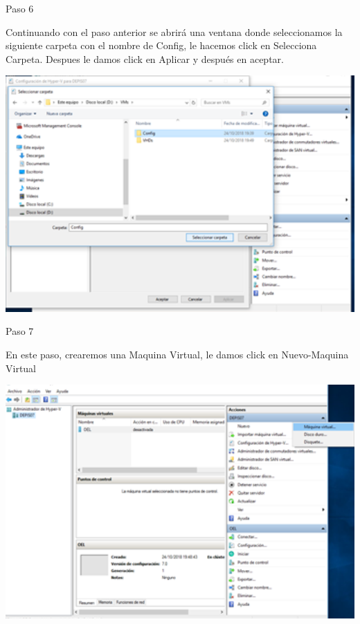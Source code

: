 	\begin{itemize}
	\begin{center}
   	 Paso 6
	\end{center}


 	   Continuando con el paso anterior se abrirá una ventana donde seleccionamos la siguiente carpeta con el nombre de Config, le hacemos click en Selecciona Carpeta. Despues le damos click en Aplicar y después en aceptar. \\
	\begin{center}
	\includegraphics[width=15cm]{./Imagenes/imagen6} 
	\end{center}


	\end{itemize} 
	\begin{itemize}
\begin{center}
    Paso 7
\end{center}


    En este paso, crearemos una Maquina Virtual, le damos click en Nuevo-Maquina Virtual \\
	\begin{center}
	\includegraphics[width=15cm]{./Imagenes/imagen7} 
	\end{center}


\end{itemize} 


